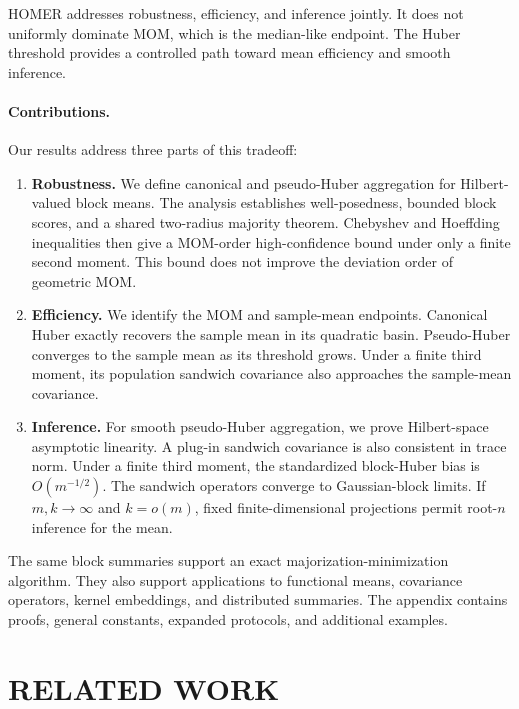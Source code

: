 \documentclass[twoside]{article}
\theoremstyle{definition}
\begin{document}
HOMER addresses robustness, efficiency, and inference jointly. It does not uniformly dominate MOM, which is the median-like endpoint. The Huber threshold provides a controlled path toward mean efficiency and smooth inference.


\paragraph{Contributions.}
Our results address three parts of this tradeoff:
\begin{enumerate}[leftmargin=*,topsep=2pt,itemsep=2pt]
    \item \textbf{Robustness.} We define canonical and pseudo-Huber aggregation for Hilbert-valued block means. The analysis establishes well-posedness, bounded block scores, and a shared two-radius majority theorem. Chebyshev and Hoeffding inequalities then give a MOM-order high-confidence bound under only a finite second moment. This bound does not improve the deviation order of geometric MOM.
    \item \textbf{Efficiency.} We identify the MOM and sample-mean endpoints. Canonical Huber exactly recovers the sample mean in its quadratic basin. Pseudo-Huber converges to the sample mean as its threshold grows. Under a finite third moment, its population sandwich covariance also approaches the sample-mean covariance.
    \item \textbf{Inference.} For smooth pseudo-Huber aggregation, we prove Hilbert-space asymptotic linearity. A plug-in sandwich covariance is also consistent in trace norm. Under a finite third moment, the standardized block-Huber bias is $O(m^{-1/2})$. The sandwich operators converge to Gaussian-block limits. If $m,k\to\infty$ and $k=o(m)$, fixed finite-dimensional projections permit root-$n$ inference for the mean.
\end{enumerate}
The same block summaries support an exact majorization-minimization algorithm. They also support applications to functional means, covariance operators, kernel embeddings, and distributed summaries. The appendix contains proofs, general constants, expanded protocols, and additional examples.


\section{RELATED WORK}
\end{document}
